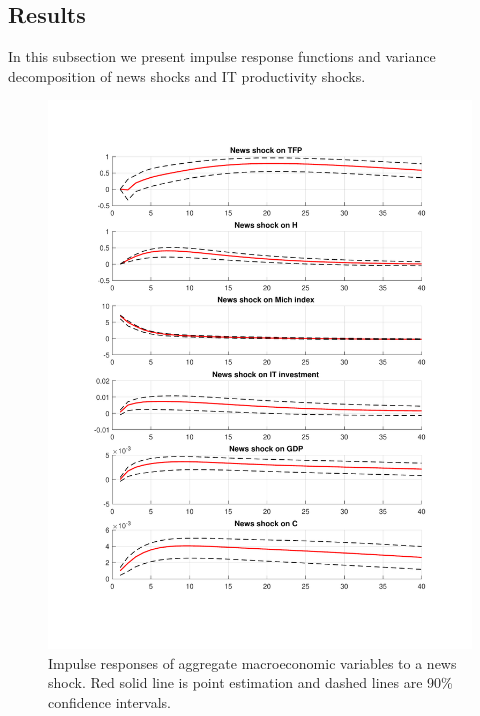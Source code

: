 \documentclass{article}
\begin{document}
\subsection{Results}

In this subsection we present impulse response functions and variance decomposition of news shocks and IT productivity shocks. 

\begin{figure}[h!]
	\centering
	\includegraphics[scale=0.5]{figure(1)_IT}
	\caption{Impulse responses of aggregate macroeconomic variables to a news shock. Red solid line is point estimation and dashed lines are 90\% confidence intervals.}
\end{figure}
\end{document}
